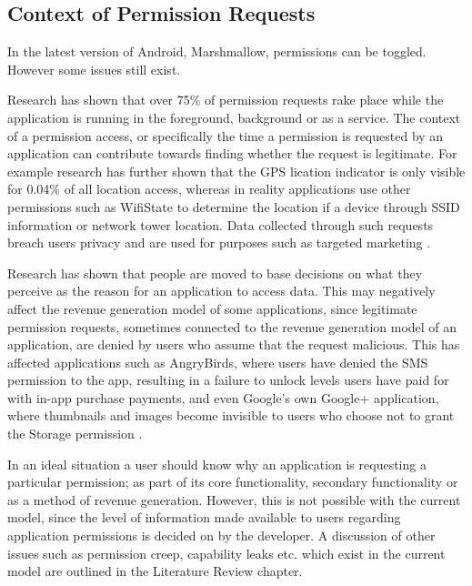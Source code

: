 \subsection{Context of Permission Requests}
In the latest version of Android, Marshmallow, permissions can be toggled. However some issues still exist. 
\smallskip

Research has shown that over 75\% of permission requests rake place while the application is running in the foreground, background or as a service\cite{wijesekera2015android}. The context of a permission access, or specifically the time a permission is requested by an application can contribute towards finding whether the request is legitimate. For example research has further shown that the GPS lication indicator is only visible for 0.04\% of all location access, whereas in reality applications use other permissions such as WifiState to determine the location if a device through SSID information or network tower location. Data collected through such requests breach users privacy and are used for purposes such as targeted marketing \cite{saint201050}.
\smallskip

Research has shown that people are moved to base decisions on what they perceive as the reason for an application to access data\cite{wijesekera2015android}. This may negatively affect the revenue generation model of some applications, since legitimate permission requests, sometimes connected to the revenue generation model of an application, are denied by users who assume that the request malicious. This has affected applications such as AngryBirds, where users have denied the SMS permission to the app, resulting in a failure to unlock levels users have paid for with in-app purchase payments, and even Google's own Google+ application, where thumbnails and images become invisible to users who choose not to grant the Storage permission\cite{u} \cite{w}.
\smallskip

In an ideal situation a user should know why an application is requesting a particular permission; as part of its core functionality, secondary functionality or as a method of revenue generation. However, this is not possible with the current model, since the level of information made available to users regarding application permissions is decided on by the developer. A discussion of other issues such as permission creep, capability leaks etc. which exist in the current model are outlined in the Literature Review chapter. 

